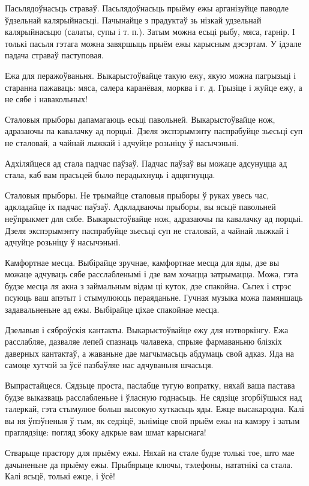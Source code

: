Пасьлядоўнасьць страваў.
Пасьлядоўнасьць прыёму ежы арганізуйце паводле ўдзельнай калярыйнасьці. Пачынайце з прадуктаў зь нізкай удзельнай калярыйнасьцю (салаты, супы і т. п.). Затым можна есьці рыбу, мяса, гарнір. І толькі пасьля гэтага можна завяршыць прыём ежы карысным дэсэртам. У ідэале падача страваў паступовая.

Ежа для перажоўваньня.
Выкарыстоўвайце такую ежу, якую можна пагрызьці і старанна пажаваць: мяса, салера каранёвая, морква і г. д. Грызіце і жуйце ежу, а не сябе і навакольных!

Сталовыя прыборы дапамагаюць есьці павольней. Выкарыстоўвайце нож, адразаючы па кавалачку ад порцыі. Дзеля экспэрымэнту паспрабуйце зьесьці суп не сталовай, а чайнай лыжкай і адчуйце розьніцу ў насычэньні.

Адхіляйцеся ад стала падчас паўзаў.
Падчас паўзаў вы можаце адсунуцца ад стала, каб вам прасьцей было перадыхнуць і адцягнуцца.

Сталовыя прыборы.
Не трымайце сталовыя прыборы ў руках увесь час, адкладайце іх падчас паўзаў. Адкладваючы прыборы, вы ясьцё павольней неўпрыкмет для сябе. Выкарыстоўвайце нож, адразаючы па кавалачку ад порцыі. Дзеля экспэрымэнту паспрабуйце зьесьці суп не сталовай, а чайнай лыжкай і адчуйце розьніцу ў насычэньні.

Камфортнае месца.
Выбірайце зручнае, камфортнае месца для яды, дзе вы можаце адчуваць сябе расслабленымі і дзе вам хочацца затрымацца. Можа, гэта будзе месца ля акна з займальным відам ці куток, дзе спакойна. Сьпех і стрэс псуюць ваш апэтыт і стымулююць пераяданьне. Гучная музыка можа памяншаць задавальненьне ад ежы. Выбірайце ціхае спакойнае месца.

Дзелавыя і сяброўскія кантакты.
Выкарыстоўвайце ежу для нэтворкінгу. Ежа расслабляе, дазваляе лепей спазнаць чалавека, спрыяе фармаваньню блізкіх даверных кантактаў, а жаваньне дае магчымасьць абдумаць свой адказ. Яда на самоце хутчэй за ўсё пазбаўляе нас адчуваньня шчасьця.

Выпрастайцеся.
Сядзьце проста, паслабце тугую вопратку, няхай ваша пастава будзе выказваць расслабленьне і ўласную годнасьць. Не сядзіце згорбіўшыся над талеркай, гэта стымулюе больш высокую хуткасьць яды. Ежце высакародна. Калі вы ня ўпэўненыя ў тым, як седзіцё, зьніміце свой прыём ежы на камэру і затым праглядзіце: погляд збоку адкрые вам шмат карыснага!

Стварыце прастору для прыёму ежы. Няхай на стале будзе толькі тое, што мае дачыненьне да прыёму ежы. Прыбярыце ключы, тэлефоны, нататнікі са стала. Калі ясьцё, толькі ежце, і ўсё!

